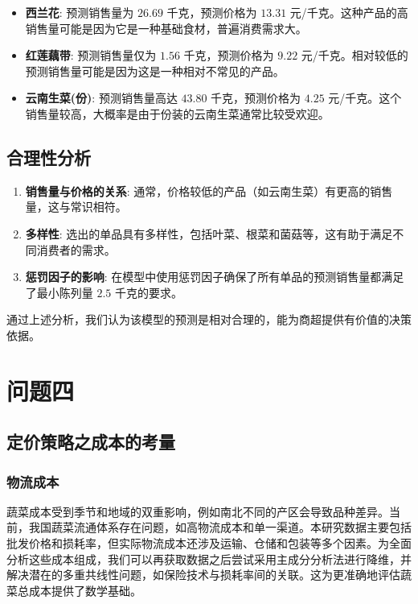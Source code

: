 \documentclass[withoutpreface,bwprint]{cumcmthesis} %
\begin{document}
\begin{itemize}
    \item \textbf{西兰花}: 预测销售量为 \(26.69\) 千克，预测价格为 \(13.31\) 元/千克。这种产品的高销售量可能是因为它是一种基础食材，普遍消费需求大。
  
    \item \textbf{红莲藕带}: 预测销售量仅为 \(1.56\) 千克，预测价格为 \(9.22\) 元/千克。相对较低的预测销售量可能是因为这是一种相对不常见的产品。
  
    \item \textbf{云南生菜(份)}: 预测销售量高达 \(43.80\) 千克，预测价格为 \(4.25\) 元/千克。这个销售量较高，大概率是由于份装的云南生菜通常比较受欢迎。
\end{itemize}

\subsection{合理性分析}

\begin{enumerate}
    \item \textbf{销售量与价格的关系}: 通常，价格较低的产品（如云南生菜）有更高的销售量，这与常识相符。

    \item \textbf{多样性}: 选出的单品具有多样性，包括叶菜、根菜和菌菇等，这有助于满足不同消费者的需求。

    \item \textbf{惩罚因子的影响}: 在模型中使用惩罚因子确保了所有单品的预测销售量都满足了最小陈列量 \(2.5\) 千克的要求。
\end{enumerate}

通过上述分析，我们认为该模型的预测是相对合理的，能为商超提供有价值的决策依据。

\section{问题四}
\subsection{定价策略之成本的考量}
\subsubsection{物流成本}
蔬菜成本受到季节和地域的双重影响，例如南北不同的产区会导致品种差异。当前，我国蔬菜流通体系存在问题，如高物流成本和单一渠道。本研究数据主要包括批发价格和损耗率，但实际物流成本还涉及运输、仓储和包装\cite{基于个体经营户视角的寿光蔬菜物流成本问题研究}等多个因素。为全面分析这些成本组成，我们可以再获取数据之后尝试采用主成分分析法进行降维，并解决潜在的多重共线性问题，如保险技术与损耗率间的关联。这为更准确地评估蔬菜总成本提供了数学基础。
\end{document}

